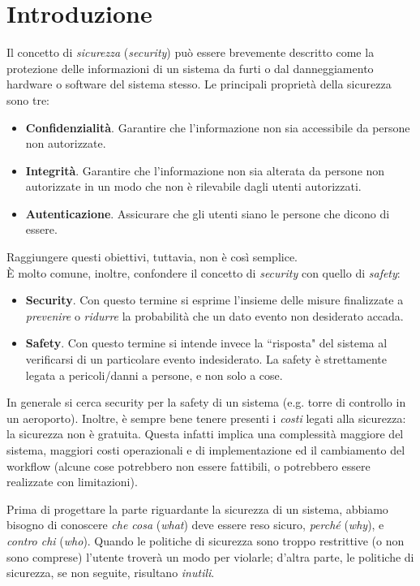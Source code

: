 \chapter{Introduzione}
Il concetto di \textit{sicurezza} (\textit{security}) può essere brevemente descritto come la protezione delle informazioni di un sistema da furti o dal danneggiamento hardware o software del sistema stesso. Le principali proprietà della sicurezza sono tre:
\begin{itemize}
	\item \textbf{Confidenzialità}. Garantire che l'informazione non sia accessibile da persone non autorizzate.
	\item \textbf{Integrità}. Garantire che l'informazione non sia alterata da persone non autorizzate in un modo che non è rilevabile dagli utenti autorizzati.
	\item \textbf{Autenticazione}. Assicurare che gli utenti siano le persone che dicono di essere.
\end{itemize}
Raggiungere questi obiettivi, tuttavia, non è così semplice.\\
È molto comune, inoltre, confondere il concetto di \textit{security} con quello di \textit{safety}:
\begin{itemize}
	\item \textbf{Security}. Con questo termine si esprime l’insieme delle misure finalizzate a \textit{prevenire} o \textit{ridurre} la probabilità che un dato evento non desiderato accada.
	\item \textbf{Safety}. Con questo termine si intende invece la \textquotedblleft risposta" del sistema al verificarsi di un particolare evento indesiderato. La safety è strettamente legata a pericoli/danni a persone, e non solo a cose.
\end{itemize}
In generale si cerca security per la safety di un sistema (e.g. torre di controllo in un aeroporto). Inoltre, è sempre bene tenere presenti i \textit{costi} legati alla sicurezza: la sicurezza non è gratuita. Questa infatti implica una complessità maggiore del sistema, maggiori costi operazionali e di implementazione ed il cambiamento del workflow (alcune cose potrebbero non essere fattibili, o potrebbero essere realizzate con limitazioni).

Prima di progettare la parte riguardante la sicurezza di un sistema, abbiamo bisogno di conoscere \textit{che cosa} (\textit{what}) deve essere reso sicuro, \textit{perché} (\textit{why}), e \textit{contro chi} (\textit{who}). Quando le politiche di sicurezza sono troppo restrittive (o non sono comprese) l'utente troverà un modo per violarle; d'altra parte, le politiche di sicurezza, se non seguite, risultano \textit{inutili}.

